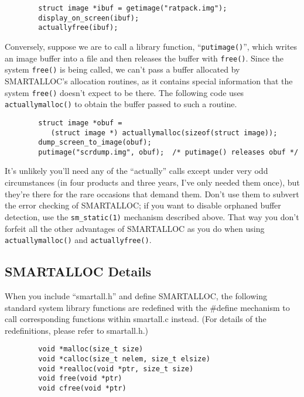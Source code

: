 \footnotesize
\begin{verbatim}
        struct image *ibuf = getimage("ratpack.img");
        display_on_screen(ibuf);
        actuallyfree(ibuf);
\end{verbatim}
\normalsize

Conversely, suppose we are to call a library function, ``{\tt putimage()}'',
which writes an image buffer into a file and then releases the buffer with
{\tt free()}. Since the system {\tt free()} is being called, we can't pass a
buffer allocated by SMARTALLOC's allocation routines, as it contains special
information that the system {\tt free()} doesn't expect to be there. The
following code uses {\tt actuallymalloc()} to obtain the buffer passed to such
a routine. 

\footnotesize
\begin{verbatim}
        struct image *obuf =
           (struct image *) actuallymalloc(sizeof(struct image));
        dump_screen_to_image(obuf);
        putimage("scrdump.img", obuf);  /* putimage() releases obuf */
\end{verbatim}
\normalsize

It's unlikely you'll need any of the ``actually'' calls except under very odd
circumstances (in four products and three years, I've only needed them once),
but they're there for the rare occasions that demand them. Don't use them to
subvert the error checking of SMARTALLOC; if you want to disable orphaned
buffer detection, use the {\tt sm\_static(1)} mechanism described above. That
way you don't forfeit all the other advantages of SMARTALLOC as you do when
using {\tt actuallymalloc()} and {\tt actuallyfree()}. 

\subsection{ SMARTALLOC Details}

When you include ``smartall.h'' and define SMARTALLOC, the following standard
system library functions are redefined with the \#define mechanism to call
corresponding functions within smartall.c instead. (For details of the
redefinitions, please refer to smartall.h.) 

\footnotesize
\begin{verbatim}
        void *malloc(size_t size)
        void *calloc(size_t nelem, size_t elsize)
        void *realloc(void *ptr, size_t size)
        void free(void *ptr)
        void cfree(void *ptr)
\end{verbatim}
\normalsize

